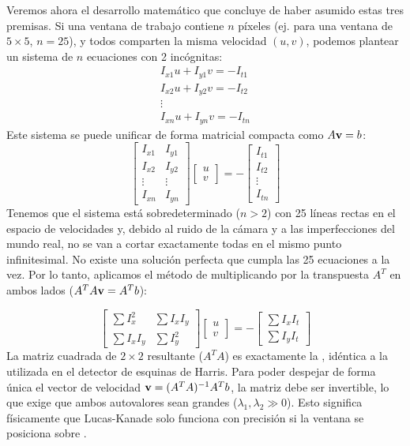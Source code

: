 \noindent
Veremos ahora el desarrollo matemático que concluye de haber asumido estas tres premisas. Si una ventana de trabajo contiene $n$ píxeles (ej. para una ventana de $5\times5$, $n=25$), y todos comparten la misma velocidad $(u,v)$, podemos plantear un sistema de $n$ ecuaciones con 2 incógnitas:
$$\begin{matrix}
I_{x1}u + I_{y1}v = -I_{t1} \\
I_{x2}u + I_{y2}v = -I_{t2} \\
\vdots \\
I_{xn}u + I_{yn}v = -I_{tn}
\end{matrix}$$
Este sistema se puede unificar de forma matricial compacta como $A\textbf{v} = b$:
$$\begin{bmatrix} I_{x1} & I_{y1} \\ I_{x2} & I_{y2} \\ \vdots & \vdots \\ I_{xn} & I_{yn} \end{bmatrix} \begin{bmatrix} u \\ v \end{bmatrix} = - \begin{bmatrix} I_{t1} \\ I_{t2} \\ \vdots \\ I_{tn} \end{bmatrix}$$
Tenemos que el sistema está sobredeterminado ($n > 2$) con 25 líneas rectas en el espacio de velocidades y, debido al ruido de la cámara y a las imperfecciones del mundo real, no se van a cortar exactamente todas en el mismo punto infinitesimal. No existe una solución perfecta que cumpla las 25 ecuaciones a la vez. Por lo tanto, aplicamos el método de  multiplicando por la transpuesta $A^T$ en ambos lados ($A^T A \textbf{v} = A^T b$):

$$\begin{bmatrix} \sum I_x^2 & \sum I_x I_y \\ \sum I_x I_y & \sum I_y^2 \end{bmatrix} \begin{bmatrix} u \\ v \end{bmatrix} = - \begin{bmatrix} \sum I_x I_t \\ \sum I_y I_t \end{bmatrix}$$
La matriz cuadrada de $2 \times 2$ resultante ($A^T A$) es exactamente la , idéntica a la utilizada en el detector de esquinas de Harris. Para poder despejar de forma única el vector de velocidad $\textbf{v} = (A^T A)^{-1} A^T b$, la matriz debe ser invertible, lo que exige que ambos autovalores sean grandes ($\lambda_1, \lambda_2 \gg 0$). Esto significa físicamente que Lucas-Kanade solo funciona con precisión si la ventana se posiciona sobre .


